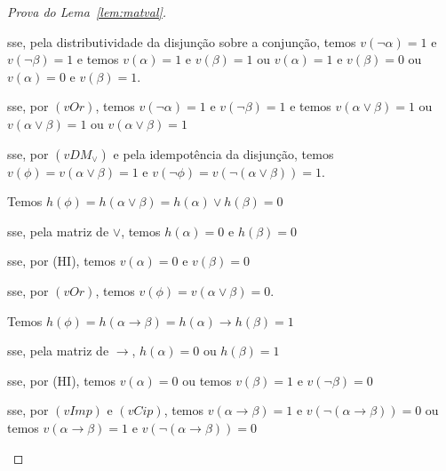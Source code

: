 \begin{proof}[Prova do Lema~\ref{lem:matval}]
\begin{provaporcasos}
\begin{provaporsubcasos}
                    \qquad{}sse, pela distributividade da disjunção sobre a conjunção, temos $v(\neg \alpha) = 1$ e $v(\neg \beta) = 1$ e temos $v(\alpha) = 1$ e $v(\beta) = 1$ ou $v(\alpha) = 1$ e $v(\beta) = 0$ ou $v(\alpha) = 0$ e $v(\beta) = 1$.

                    \qquad{}sse, por $(vOr)$, temos $v(\neg \alpha) = 1$ e $v(\neg \beta) = 1$ e temos $v(\alpha \lor \beta) = 1$ ou $v(\alpha \lor \beta) = 1$ ou $v(\alpha \lor \beta) = 1$
                    
                    \qquad{}sse, por $(vDM_{\lor})$ e pela idempotência da disjunção, temos $v(\phi) = v(\alpha \lor \beta) = 1$ e $v(\neg \phi) = v(\neg(\alpha \lor \beta)) = 1$.


                    Temos $h(\phi) = h(\alpha \lor \beta) = h(\alpha) \lor h(\beta) = 0$

                    \qquad{}sse, pela matriz de $\lor$, temos $h(\alpha) = 0$ e $h(\beta) = 0$

                    \qquad{}sse, por (HI), temos $v(\alpha) = 0$ e $v(\beta) = 0$

                    \qquad{}sse, por $(vOr)$, temos $v(\phi) = v(\alpha \lor \beta) = 0$.

            \end{provaporsubcasos}


            \begin{provaporsubcasos}

                    Temos $h(\phi) = h(\alpha \to \beta) = h(\alpha) \to h(\beta) = 1$

                    \qquad{}sse, pela matriz de $\to$, $h(\alpha) = 0$ ou $h(\beta) = 1$

                    \qquad{}sse, por (HI), temos $v(\alpha) = 0$ ou temos $v(\beta) = 1$ e $v(\neg \beta) = 0$

                    \qquad{}sse, por $(vImp)$ e $(vCip)$, temos $v(\alpha \to \beta) = 1$ e $v(\neg (\alpha \to \beta)) = 0$ ou temos $v(\alpha \to \beta) = 1$ e $v(\neg (\alpha \to \beta)) = 0$


\end{provaporsubcasos}
\end{provaporcasos}
\end{proof}

